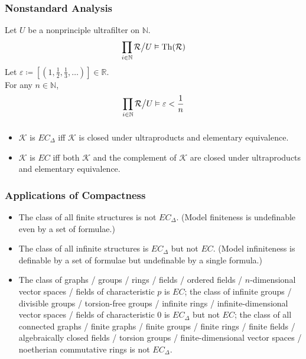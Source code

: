 \documentclass[UTF8,aspectratio=43,11pt,colorlinks,compress,openany]{beamer}%
\begin{document}
\begin{frame}\frametitle{Nonstandard Analysis}
Let $U$ be a nonprinciple ultrafilter on $\mathbb{N}$.
\[\prod\limits_{i\in\mathbb{N}}\mathcal{R}\big\slash U\vDash\operatorname{Th}(\mathcal{R})\]
Let $\varepsilon\coloneqq \left[(1,\frac{1}{2},\frac{1}{3},\dots)\right]\in\mathbb{R}$.\\
For any $n\in\mathbb{N}$,
\[\prod\limits_{i\in\mathbb{N}}\mathcal{R}\big\slash U\vDash\varepsilon<\frac{1}{n}\]
\end{frame}

\begin{frame}\frametitle{}
\begin{theorem}
\begin{itemize}
	\item $\mathcal{K}$ is $EC_\Delta$ iff $\mathcal{K}$ is closed under ultraproducts and elementary equivalence.
	\item $\mathcal{K}$ is $EC$ iff both $\mathcal{K}$ and the complement of $\mathcal{K}$ are closed under ultraproducts and elementary equivalence.
\end{itemize}
\end{theorem}
\end{frame}

\begin{frame}\frametitle{Applications of Compactness}
	\begin{itemize}
		\item The class of all finite structures is not $EC_\Delta$. (Model finiteness is undefinable even by a set of formulae.)
		\item The class of all infinite structures is $EC_\Delta$ but not $EC$. (Model infiniteness is definable by a set of formulae but undefinable by a single formula.)
		\item The class of graphs / groups / rings / fields / ordered fields / $n$-dimensional vector spaces / fields of characteristic $p$ is $EC$; the class of infinite groups / divisible groups / torsion-free groups / infinite rings / infinite-dimensional vector spaces / fields of characteristic $0$ is $EC_\Delta$ but not $EC$; the class of all connected graphs / finite graphs / finite groups / finite rings / finite fields / algebraically closed fields / torsion groups / finite-dimensional vector spaces / noetherian commutative rings is not $EC_\Delta$.
	\end{itemize}
\end{frame}
\end{document}
